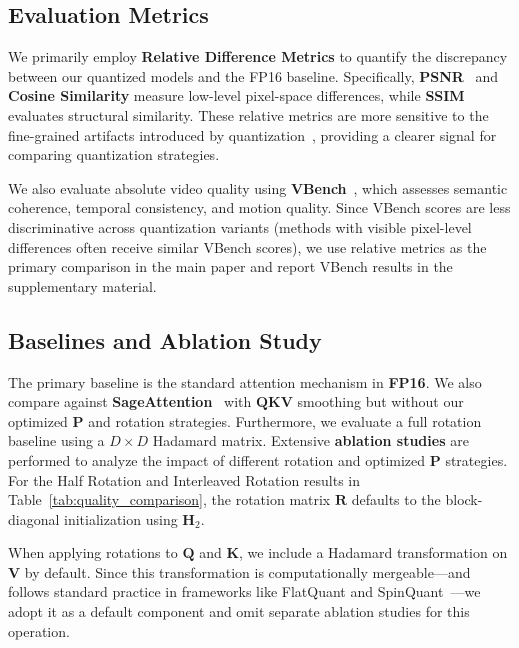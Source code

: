 \subsection{Evaluation Metrics}
We primarily employ \textbf{Relative Difference Metrics} to quantify the discrepancy between our quantized models and the FP16 baseline. Specifically, \textbf{PSNR}~\cite{korhonen2012peak} and \textbf{Cosine Similarity} measure low-level pixel-space differences, while \textbf{SSIM}~\cite{wang2004ssim} evaluates structural similarity. These relative metrics are more sensitive to the fine-grained artifacts introduced by quantization~\cite{zhao2025paroattention}, providing a clearer signal for comparing quantization strategies.

We also evaluate absolute video quality using \textbf{VBench}~\cite{huang2024vbench}, which assesses semantic coherence, temporal consistency, and motion quality. Since VBench scores are less discriminative across quantization variants (methods with visible pixel-level differences often receive similar VBench scores), we use relative metrics as the primary comparison in the main paper and report VBench results in the supplementary material.

%  


\subsection{Baselines and Ablation Study}
The primary baseline is the standard attention mechanism in \textbf{FP16}. We also compare against \textbf{SageAttention}~\cite{zhang2025sageattention1} with $\mathbf{Q}\mathbf{K}\mathbf{V}$ smoothing but without our optimized $\mathbf{P}$ and rotation strategies. Furthermore, we evaluate a full rotation baseline using a $D \times D$ Hadamard matrix. Extensive \textbf{ablation studies} are performed to analyze the impact of different rotation and optimized $\mathbf{P}$ strategies. For the Half Rotation and Interleaved Rotation results in Table~\ref{tab:quality_comparison}, the rotation matrix $\mathbf{R}$ defaults to the block-diagonal initialization using $\mathbf{H}_2$.

When applying rotations to $\mathbf{Q}$ and $\mathbf{K}$, we include a Hadamard transformation on $\mathbf{V}$ by default. Since this transformation is computationally mergeable---and follows standard practice in frameworks like FlatQuant and SpinQuant~\cite{liu2025spinquant,sun2025flatquant}---we adopt it as a default component and omit separate ablation studies for this operation.

